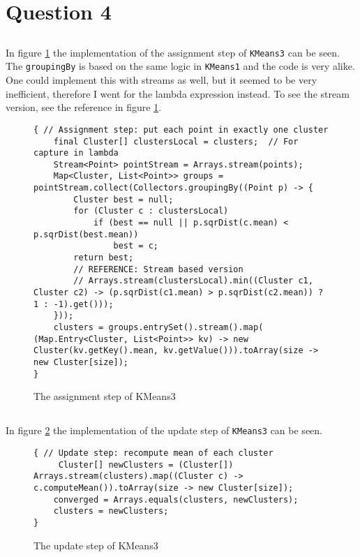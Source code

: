 \section{Question 4}
\subsection{}
In figure \ref{code:4:1} the implementation of the assignment step of \texttt{KMeans3} can be seen. The \texttt{groupingBy} is based on the same logic in \texttt{KMeans1} and the code is very alike. One could implement this with streams as well, but it seemed to be very inefficient, therefore I went for the lambda expression instead. To see the stream version, see the reference in figure \ref{code:4:1}.

\begin{figure}
\begin{lstlisting}
{ // Assignment step: put each point in exactly one cluster
    final Cluster[] clustersLocal = clusters;  // For capture in lambda
    Stream<Point> pointStream = Arrays.stream(points);
    Map<Cluster, List<Point>> groups = pointStream.collect(Collectors.groupingBy((Point p) -> {
        Cluster best = null;
        for (Cluster c : clustersLocal)
            if (best == null || p.sqrDist(c.mean) < p.sqrDist(best.mean))
                best = c;
        return best;
        // REFERENCE: Stream based version
        // Arrays.stream(clustersLocal).min((Cluster c1, Cluster c2) -> (p.sqrDist(c1.mean) > p.sqrDist(c2.mean)) ? 1 : -1).get()));
    }));
    clusters = groups.entrySet().stream().map( (Map.Entry<Cluster, List<Point>> kv) -> new Cluster(kv.getKey().mean, kv.getValue())).toArray(size -> new Cluster[size]);
}
\end{lstlisting}
\caption{The assignment step of KMeans3}
\label{code:4:1}
\end{figure}

\subsection{}
In figure \ref{code:4:2} the implementation of the update step of \texttt{KMeans3} can be seen. 

\begin{figure}
\begin{lstlisting}
{ // Update step: recompute mean of each cluster
     Cluster[] newClusters = (Cluster[]) Arrays.stream(clusters).map((Cluster c) -> c.computeMean()).toArray(size -> new Cluster[size]);
    converged = Arrays.equals(clusters, newClusters);
    clusters = newClusters;
}
\end{lstlisting}
\caption{The update step of KMeans3}
\label{code:4:2}
\end{figure}
\clearpage
